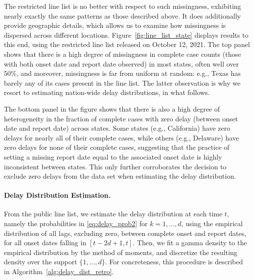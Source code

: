 \documentclass[sts]{imsart}
\theoremstyle{plain}
\theoremstyle{definition}
\theoremstyle{remark}
\begin{document}
The restricted line list is no better with respect to such missingness, 
exhibiting nearly exactly the same patterns as those described above. It
does additionally provide geographic details, which allows us to examine how  
missingness is dispersed across different locations. 
Figure~\ref{fig:line_list_state} displays results to this end, using  
the restricted line list released on October 12, 2021. The top panel shows that
there is a high degree of missingness in complete case counts (those with
both onset date and report date observed) in most states, often well over 50\%,
and moreover, missingness is far from uniform at random: e.g., Texas has barely
any of its cases present in the line list. The latter observation is why we
resort to estimating nation-wide delay distributions, in what follows. 

The bottom panel in the figure shows that there is also a high degree of
heterogeneity in the fraction of complete cases with zero delay (between onset
date and report date) across states. Some states (e.g., California) have zero
delays for nearly all of their complete cases, while others (e.g., Delaware)
have zero delays for none of their complete cases, suggesting that the practice
of setting a missing report date equal to the associated onset date is highly
inconsistent between states. This only further corroborates the decision to
exclude zero delays from the data set when estimating the delay distribution. 

\smallskip
\paragraph*{Delay Distribution Estimation.}

From the public line list, we estimate the delay distribution at each time $t$, 
namely the probabilities in \eqref{eq:delay_prob2} for $k=1,\ldots,d$, using the  
empirical distribution of all lags, excluding zero, between complete onset and
report dates, for all onset dates falling in $[t-2d+1, t]$. Then, we fit a gamma
density to the empirical distribution by the method of moments, and discretize
the resulting density over the support $\{1,\ldots,d\}$. For concreteness,
this procedure is described in Algorithm~\ref{alg:delay_dist_retro}.   
\end{document}
